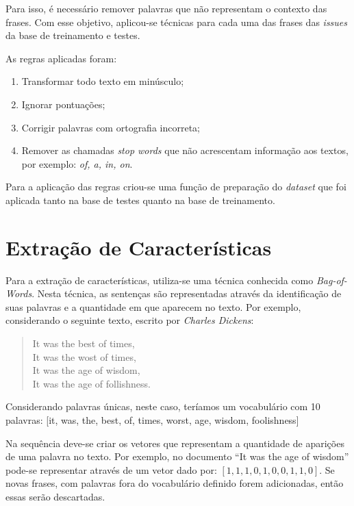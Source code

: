 \documentclass[conference]{IEEEtran}
\begin{document}
Para isso, é necessário remover palavras que não representam o contexto das frases. Com esse objetivo, aplicou-se técnicas para cada uma das frases das \textit{issues} da base de treinamento e testes.

As regras aplicadas foram:

\begin{enumerate}
    \item Transformar todo texto em minúsculo;
    \item Ignorar pontuações;
    \item Corrigir palavras com ortografia incorreta;
    \item Remover as chamadas \textit{stop words} que não acrescentam informação aos textos, por exemplo: \textit{of, a, in, on}.
\end{enumerate}

Para a aplicação das regras criou-se uma função de preparação do \textit{dataset} que foi aplicada tanto na base de testes quanto na base de treinamento.

\section{Extração de Características}

Para a extração de características, utiliza-se uma técnica conhecida como \textit{Bag-of-Words}. Nesta técnica, as sentenças são representadas através da identificação de suas palavras e a quantidade em que aparecem no texto. Por exemplo, considerando o seguinte texto, escrito por \textit{Charles Dickens}:

\begin{quote}
    It was the best of times,\\
    It was the wost of times,\\
    It was the age of wisdom,\\
    It was the age of follishness.
\end{quote}

Considerando palavras únicas, neste caso, teríamos um vocabulário com 10 palavras: [it, was,
the, best, of, times, worst, age, wisdom, foolishness]

Na sequência deve-se criar os vetores que representam a quantidade de aparições de uma palavra no texto. Por exemplo, no documento ``It was the age of wisdom'' pode-se representar através de um vetor dado por: $[1, 1, 1, 0, 1, 0, 0, 1, 1, 0]$. Se novas frases, com palavras fora do vocabulário definido forem adicionadas, então essas serão descartadas.
\end{document}
